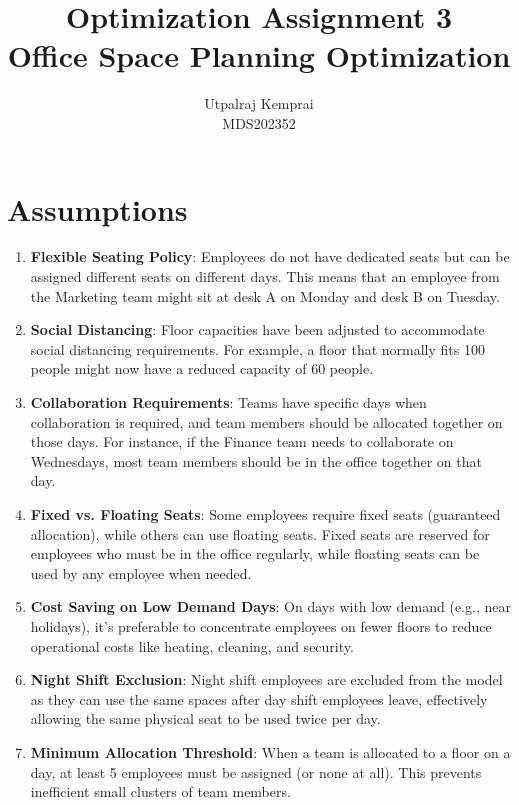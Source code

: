 \documentclass[12pt,a4paper]{article}
\title{Optimization Assignment 3\\
Office Space Planning Optimization\\}
\author{Utpalraj Kemprai\\
MDS202352}
\date{}
\begin{document}
\maketitle

\section{Assumptions}

\begin{enumerate}
\item \textbf{Flexible Seating Policy}: Employees do not have dedicated seats but can be assigned different seats on different days. This means that an employee from the Marketing team might sit at desk A on Monday and desk B on Tuesday.

\item \textbf{Social Distancing}: Floor capacities have been adjusted to accommodate social distancing requirements. For example, a floor that normally fits 100 people might now have a reduced capacity of 60 people.

\item \textbf{Collaboration Requirements}: Teams have specific days when collaboration is required, and team members should be allocated together on those days. For instance, if the Finance team needs to collaborate on Wednesdays, most team members should be in the office together on that day.

\item \textbf{Fixed vs. Floating Seats}: Some employees require fixed seats (guaranteed allocation), while others can use floating seats. Fixed seats are reserved for employees who must be in the office regularly, while floating seats can be used by any employee when needed.

\item \textbf{Cost Saving on Low Demand Days}: On days with low demand (e.g., near holidays), it's preferable to concentrate employees on fewer floors to reduce operational costs like heating, cleaning, and security.

\item \textbf{Night Shift Exclusion}: Night shift employees are excluded from the model as they can use the same spaces after day shift employees leave, effectively allowing the same physical seat to be used twice per day.

\item \textbf{Minimum Allocation Threshold}: When a team is allocated to a floor on a day, at least 5 employees must be assigned (or none at all). This prevents inefficient small clusters of team members.


\end{enumerate}
\end{document}
